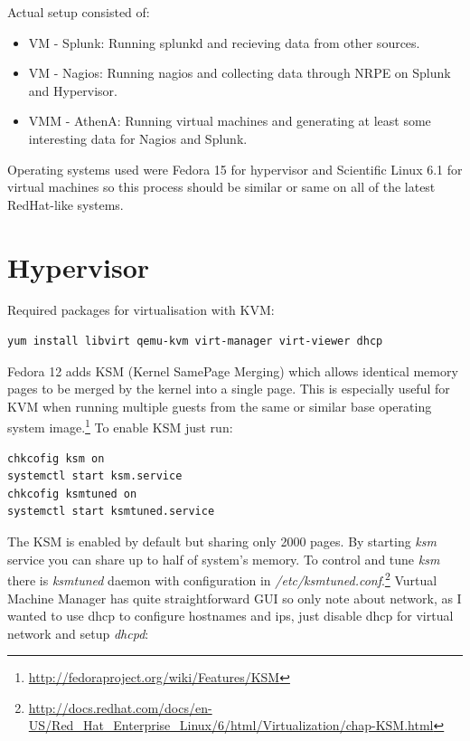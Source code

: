 \documentclass[10pt,a4paper,final]{report}
\begin{document}
Actual setup consisted of:
\begin{itemize}
\item VM - Splunk: Running splunkd and recieving data from other sources.
\item VM - Nagios: Running nagios and collecting data through NRPE on Splunk and Hypervisor.
\item VMM - AthenA: Running virtual machines and generating at least some interesting data for Nagios and Splunk.
\end{itemize}
Operating systems used were Fedora 15 for hypervisor and Scientific Linux 6.1 for virtual machines so this process should be similar or same on all of the latest RedHat-like systems.

\section{Hypervisor}
Required packages for virtualisation with KVM:
\begin{lstlisting}
yum install libvirt qemu-kvm virt-manager virt-viewer dhcp
\end{lstlisting} 
Fedora 12 adds KSM (Kernel SamePage Merging) which allows identical memory pages to be merged by the kernel into a single page. This is especially useful for KVM when running multiple guests from the same or similar base operating system image.\footnote{\url{http://fedoraproject.org/wiki/Features/KSM}} To enable KSM just run:

\begin{lstlisting}
chkcofig ksm on
systemctl start ksm.service
chkcofig ksmtuned on
systemctl start ksmtuned.service
\end{lstlisting}
The KSM is enabled by default but sharing only 2000 pages. By starting \emph{ksm} service you can share up to half of system's memory. To control and tune \emph{ksm} there is \emph{ksmtuned} daemon with configuration in \emph{/etc/ksmtuned.conf}.\footnote{\url{http://docs.redhat.com/docs/en-US/Red\_Hat\_Enterprise\_Linux/6/html/Virtualization/chap-KSM.html}}
Vurtual Machine Manager has quite straightforward GUI so only note about network, as I wanted to use dhcp to configure hostnames and ips, just disable dhcp for virtual network and setup \emph{dhcpd}:
\end{document}
